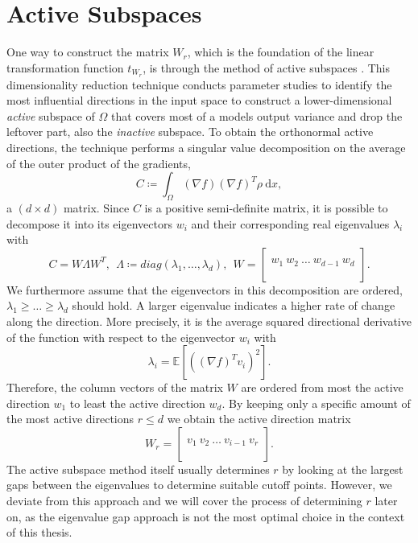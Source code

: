 \documentclass[
  a4paper,  %
  twoside,  %
  bibliography=totoc,
  headsepline,
  cleardoublepage=empty,
  parskip=half,
  draft=false
]{scrbook}
\begin{document}
\section{Active Subspaces}
\label{sec:as}

One way to construct the matrix $W_r$, which is the foundation of the linear transformation function $t_{W_r}$, is through the method of active subspaces \cite{Constantine2015a}.
This dimensionality reduction technique conducts parameter studies to identify the most influential directions in the input space to construct a lower-dimensional \textit{active} subspace of $\Omega$ that covers most of a models output variance and drop the leftover part, also \ie the \textit{inactive} subspace.
To obtain the orthonormal active directions, the technique performs a singular value decomposition on the average of the outer product of the gradients,
\begin{equation}
C \coloneqq \int_{\Omega} (\nabla f) (\nabla f)^T \rho ~ \mathrm{d}x,
\label{eq:as_c}
\end{equation}
a $(d \times d)$ matrix.
Since $C$ is a positive semi-definite matrix, it is possible to decompose it into its eigenvectors $w_i$ and their corresponding real eigenvalues $\lambda_i$ with
\begin{equation}
C = W \Lambda W^T, ~~ \Lambda \coloneqq diag(\lambda_1, \dots, \lambda_d), ~~ W =
  \begin{bmatrix}
  \\
    w_1 ~ w_2 ~ \dots ~ w_{d-1} ~ w_d\\
    \\
  \end{bmatrix}.
\end{equation}
%
We furthermore assume that the eigenvectors in this decomposition are ordered, \ie $\lambda_1 \geq \dots \geq \lambda_d$ should hold.
A larger eigenvalue indicates a higher rate of change along the direction.
More precisely, it is the average squared directional derivative of the function with respect to the eigenvector $w_i$ \cite{CG14} with
\begin{equation}
\lambda_i=\mathds{E}\left[\left(\left(\nabla f\right)^T v_i\right)^2\right].
\label{eigenvalues}
\end{equation}
%
Therefore, the column vectors of the matrix $W$ are ordered from most the active direction $w_1$ to least the active direction $w_d$.
By keeping only a specific amount of the most active directions $r \leq d$ we obtain the active direction matrix
\begin{equation}
W_r=\begin{bmatrix}
  \\
    v_1 ~ v_2 ~ \dots ~ v_{i-1} ~ v_r\\
    \\
  \end{bmatrix}.
\label{basis}
\end{equation}
%
The active subspace method itself usually determines $r$ by looking at the largest gaps between the eigenvalues to determine suitable cutoff points.
However, we deviate from this approach and we will cover the process of determining $r$ later on, as the eigenvalue gap approach is not the most optimal choice in the context of this thesis.
\end{document}
